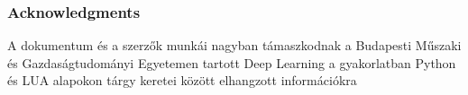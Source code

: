 \subsubsection*{Acknowledgments}

A dokumentum és a szerzők munkái nagyban támaszkodnak a Budapesti Műszaki és Gazdaságtudományi Egyetemen tartott Deep Learning a gyakorlatban Python és LUA alapokon tárgy keretei között elhangzott információkra